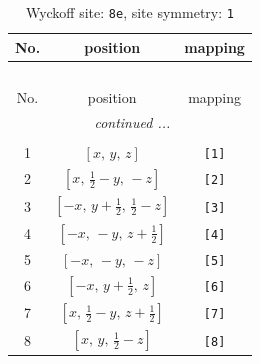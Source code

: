 \documentclass[fleqn,8pt]{jsarticle}
\begin{document}
\renewcommand{\arraystretch}{1.2}
\begin{longtable}{ccc}
\caption{Wyckoff site: {\tt 8e}, site symmetry: {\tt 1}}
 \\
 \hline \hline
No. & position & mapping \\ \hline \endfirsthead

\multicolumn{2}{l}{\tablename\ \thetable{}} \\
 \hline \hline
No. & position & mapping \\ \hline \endhead

 \hline \hline
\multicolumn{2}{r}{\footnotesize\it continued ...} \\ \endfoot

 \hline \hline
\multicolumn{2}{r}{} \\ \endlastfoot

1 & $\left[ x,\, y,\, z \right]$ & {\tt [1]} \\ \hline
2 & $\left[ x,\, \frac{1}{2} - y,\, - z \right]$ & {\tt [2]} \\ \hline
3 & $\left[ - x,\, y + \frac{1}{2},\, \frac{1}{2} - z \right]$ & {\tt [3]} \\ \hline
4 & $\left[ - x,\, - y,\, z + \frac{1}{2} \right]$ & {\tt [4]} \\ \hline
5 & $\left[ - x,\, - y,\, - z \right]$ & {\tt [5]} \\ \hline
6 & $\left[ - x,\, y + \frac{1}{2},\, z \right]$ & {\tt [6]} \\ \hline
7 & $\left[ x,\, \frac{1}{2} - y,\, z + \frac{1}{2} \right]$ & {\tt [7]} \\ \hline
8 & $\left[ x,\, y,\, \frac{1}{2} - z \right]$ & {\tt [8]} \\
\end{longtable}
\end{document}
